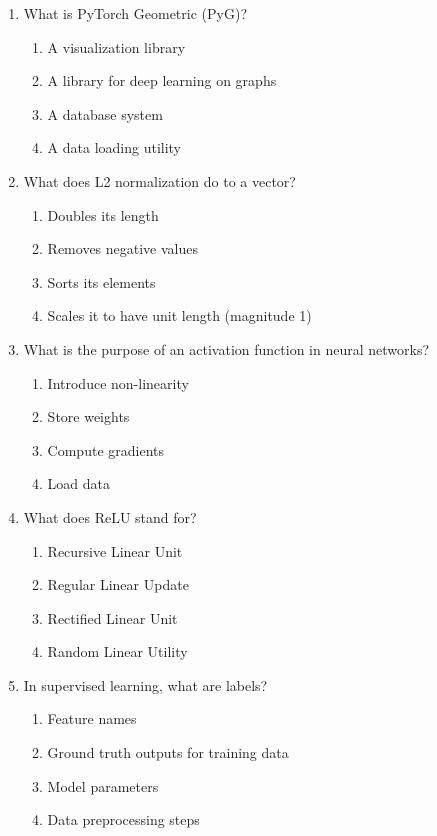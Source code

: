 \documentclass[12pt,a4paper]{article}
\begin{document}
\begin{enumerate}
\item What is PyTorch Geometric (PyG)?
\begin{enumerate}[label=\Alph*)]
    \item A visualization library
    \item A library for deep learning on graphs
    \item A database system
    \item A data loading utility
\end{enumerate}

\item What does L2 normalization do to a vector?
\begin{enumerate}[label=\Alph*)]
    \item Doubles its length
    \item Removes negative values
    \item Sorts its elements
    \item Scales it to have unit length (magnitude 1)
\end{enumerate}

\item What is the purpose of an activation function in neural networks?
\begin{enumerate}[label=\Alph*)]
    \item Introduce non-linearity
    \item Store weights
    \item Compute gradients
    \item Load data
\end{enumerate}

\item What does ReLU stand for?
\begin{enumerate}[label=\Alph*)]
    \item Recursive Linear Unit
    \item Regular Linear Update
    \item Rectified Linear Unit
    \item Random Linear Utility
\end{enumerate}

\item In supervised learning, what are labels?
\begin{enumerate}[label=\Alph*)]
    \item Feature names
    \item Ground truth outputs for training data
    \item Model parameters
    \item Data preprocessing steps
\end{enumerate}


\end{enumerate}
\end{document}
